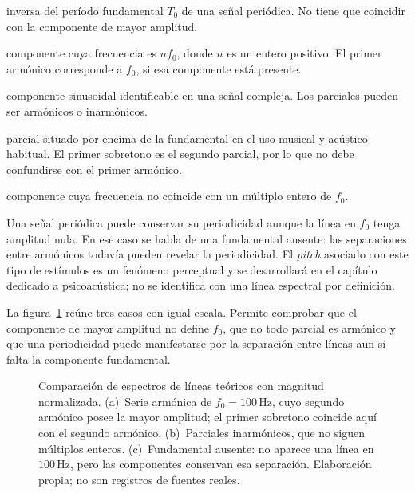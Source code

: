 \begin{description}[style=nextline]
    \item[\textbf{Frecuencia fundamental (\(f_0\)):}]
    inversa del período fundamental \(T_0\) de una señal periódica. No tiene
    que coincidir con la componente de mayor amplitud.

    \item[\textbf{Armónico:}]
    componente cuya frecuencia es \(nf_0\), donde \(n\) es un entero
    positivo. El primer armónico corresponde a \(f_0\), si esa componente está
    presente.

    \item[\textbf{Parcial:}]
    componente sinusoidal identificable en una señal compleja. Los parciales
    pueden ser armónicos o inarmónicos.

    \item[\textbf{Sobretono:}]
    parcial situado por encima de la fundamental en el uso musical y
    acústico habitual. El primer sobretono es el segundo parcial, por lo que
    no debe confundirse con el primer armónico.

    \item[\textbf{Parcial inarmónico:}]
    componente cuya frecuencia no coincide con un múltiplo entero de
    \(f_0\).
\end{description}

Una señal periódica puede conservar su periodicidad aunque la línea en
\(f_0\) tenga amplitud nula. En ese caso se habla de una fundamental ausente:
las separaciones entre armónicos todavía pueden revelar la periodicidad. El
\emph{pitch} asociado con este tipo de estímulos es un fenómeno perceptual y
se desarrollará en el capítulo dedicado a psicoacústica; no se identifica con
una línea espectral por definición.

La figura~\ref{fig:u5-componentes-espectrales} reúne tres casos con igual
escala. Permite comprobar que el componente de mayor amplitud no define
\(f_0\), que no todo parcial es armónico y que una periodicidad puede
manifestarse por la separación entre líneas aun si falta la componente
fundamental.

\begin{figure}[htbp]
    \centering
    
    \caption{Comparación de espectros de líneas teóricos con magnitud
    normalizada. (a)~Serie armónica de \(f_0=100\,\text{Hz}\), cuyo segundo
    armónico posee la mayor amplitud; el primer sobretono coincide aquí con el
    segundo armónico. (b)~Parciales inarmónicos, que no siguen múltiplos
    enteros. (c)~Fundamental ausente: no aparece una línea en
    \(100\,\text{Hz}\), pero las componentes conservan esa separación.
    Elaboración propia; no son registros de fuentes reales.}
    \label{fig:u5-componentes-espectrales}
\end{figure}

